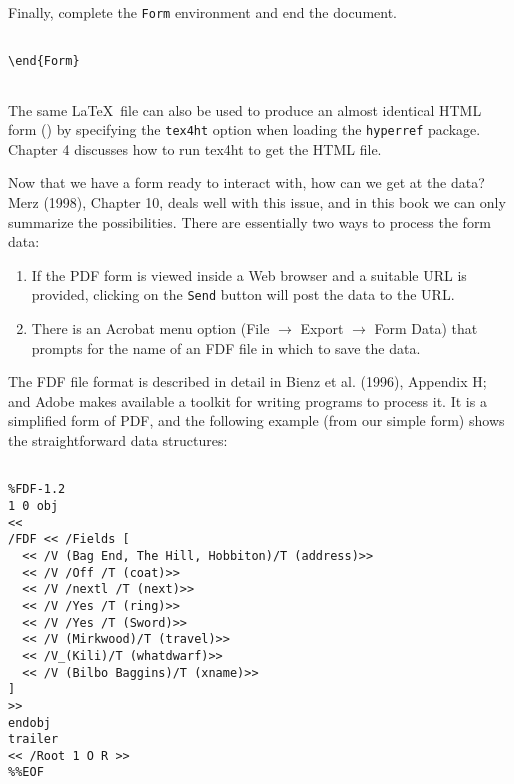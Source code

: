 Finally, complete the \verb|Form| environment and end the document. 

\begin{verbatim}

\end{Form} 
 

\end{verbatim}
 

The same \LaTeX\  file can also be used to produce an almost identical HTML 
form () by specifying the \verb|tex4ht| option when loading the \verb|hyperref| 
package. Chapter 4 discusses how to run tex4ht to get the HTML file. 

Now that we have a form ready to interact with, how can we get at the data? 
Merz (1998), Chapter 10, deals well with this issue, and in this book we can only 
summarize the possibilities. There are essentially two ways to process the form data: 

\begin{enumerate}
  \item  If the PDF form is viewed inside a Web browser and a suitable URL is provided, 
    clicking on the \verb|Send| button will post the data to the URL. 
  \item  There is an Acrobat menu option (File $\rightarrow$ Export
    $\rightarrow$ Form Data) that prompts for the name of an FDF file in
    which to save the data. 
\end{enumerate}

The FDF file format is described in detail in Bienz et al. (1996),
Appendix H; and Adobe makes available a toolkit for writing programs to
process it. It is a simplified form of PDF, and the following example
(from our simple form) shows the straightforward data structures:  
 

\begin{verbatim}
 
%FDF-1.2 
1 0 obj 
<< 
/FDF << /Fields [ 
  << /V (Bag End, The Hill, Hobbiton)/T (address)>> 
  << /V /Off /T (coat)>> 
  << /V /nextl /T (next)>> 
  << /V /Yes /T (ring)>> 
  << /V /Yes /T (Sword)>> 
  << /V (Mirkwood)/T (travel)>> 
  << /V_(Kili)/T (whatdwarf)>> 
  << /V (Bilbo Baggins)/T (xname)>> 
] 
>> 
endobj 
trailer 
<< /Root 1 O R >> 
%%EOF 

\end{verbatim}

